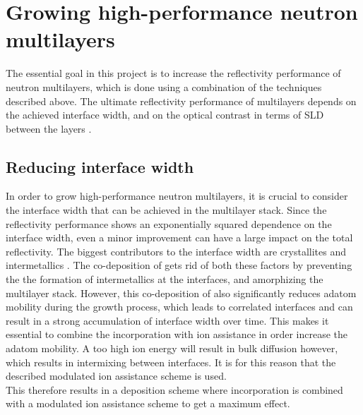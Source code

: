 \section{Growing high-performance neutron multilayers}
The essential goal in this project is to increase the reflectivity performance of neutron multilayers, which is done using a combination of the techniques described above. The ultimate reflectivity performance of multilayers depends on the achieved interface width, and on the optical contrast in terms of SLD between the layers \cite{contrast_interface_width}. 
\subsection{Reducing interface width}
In order to grow high-performance neutron multilayers, it is crucial to consider the interface width that can be achieved in the multilayer stack. Since the reflectivity performance shows an exponentially squared dependence on the interface width, even a minor improvement can have a large impact on the total reflectivity. The biggest contributors to the interface width are crystallites and intermetallics \cite{characterization_paper}. The co-deposition of \BC gets rid of both these factors by preventing the the formation of intermetallics at the interfaces, and amorphizing the multilayer stack. However, this co-deposition of \BC also significantly reduces adatom mobility during the growth process, which leads to correlated interfaces and can result in a strong accumulation of interface width over time. This makes it essential to combine the \BC incorporation with ion assistance in order increase the adatom mobility. A too high ion energy will result in bulk diffusion however, which results in intermixing between interfaces. It is for this reason that the described modulated ion assistance scheme is used. \\
This therefore results in a deposition scheme where \BC incorporation is combined with a modulated ion assistance scheme to get a maximum effect.
